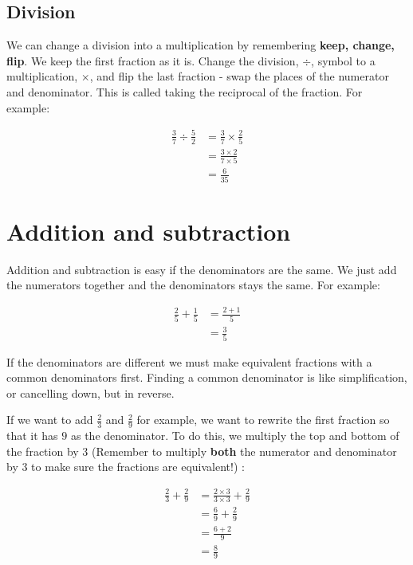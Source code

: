 \documentclass[
  a4paper,
]{scrbook}
\begin{document}
\subsection{Division}\label{division}

We can change a division into a multiplication by remembering
\textbf{keep, change, flip}. We keep the first fraction as it is. Change
the division, \(\div\), symbol to a multiplication, \(\times\), and flip
the last fraction - swap the places of the numerator and denominator.
This is called taking the reciprocal of the fraction. For example:

\[
\begin{aligned} \frac{3}{7} \div \frac{5}{2} &= \frac{3}{7} \times \frac{2}{5} \\
&= \frac{3 \times 2}{7 \times 5} \\
&= \frac{6}{35}
\end{aligned}
\]

\section{Addition and subtraction}\label{addition-and-subtraction-1}

Addition and subtraction is easy if the denominators are the same. We
just add the numerators together and the denominators stays the same.
For example:

\[
\begin{aligned} \frac{2}{5} + \frac{1}{5} &= \frac{2+1}{5} \\
&= \frac{3}{5}
\end{aligned}
\]

If the denominators are different we must make equivalent fractions with
a common denominators first. Finding a common denominator is like
simplification, or cancelling down, but in reverse.

If we want to add \(\frac{2}{3}\) and \(\frac{2}{9}\) for example, we
want to rewrite the first fraction so that it has \(9\) as the
denominator. To do this, we multiply the top and bottom of the fraction
by \(3\) (Remember to multiply \textbf{both} the numerator and
denominator by \(3\) to make sure the fractions are equivalent!) :

\[
\begin{aligned} \frac{2}{3} + \frac{2}{9} &= \frac{2 \times 3}{3 \times 3} + \frac{2}{9} \\
&= \frac{6}{9} + \frac{2}{9} \\
&= \frac{6 + 2}{9} \\
&= \frac{8}{9}
\end{aligned}
\]
\end{document}
